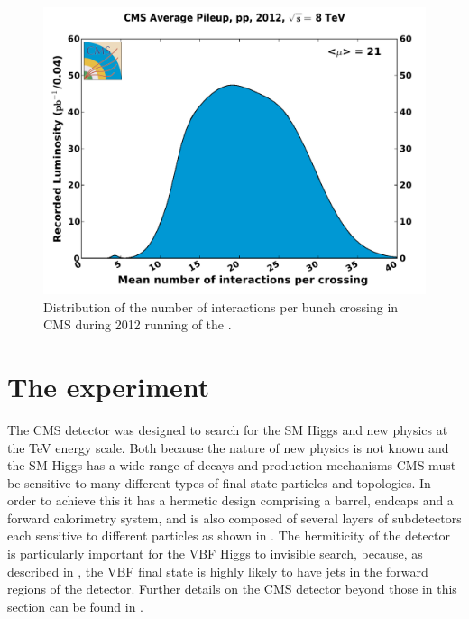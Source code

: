 \begin{figure}
  \includegraphics[width=1.2\largefigwidth]{plots/detector/pileup_pp_2012.pdf}
  \caption{Distribution of the number of interactions per bunch crossing in CMS during 2012 running of the \LHC \cite{CMSLumiPublic}.}
  \label{fig:pusummary}
\end{figure}


\section{The \CMS experiment}
\label{sec:CMSInDetail}
The CMS detector was designed to search for the SM Higgs and new physics at the TeV energy scale. Both because the nature of new physics is not known and the SM Higgs has a wide range of decays and production mechanisms CMS must be sensitive to many different types of final state particles and topologies. In order to achieve this it has a hermetic design comprising a barrel, endcaps and a forward calorimetry system, and is also composed of several layers of subdetectors each sensitive to different particles as shown in . The hermiticity of the detector is particularly important for the VBF Higgs to invisible search, because, as described in , the VBF final state is highly likely to have jets in the forward regions of the detector. Further details on the CMS detector beyond those in this section can be found in .

